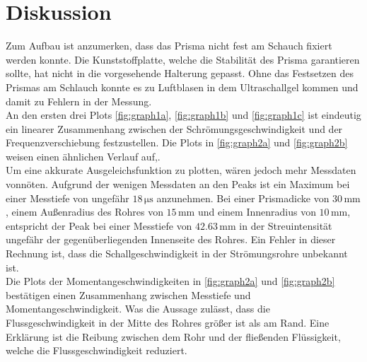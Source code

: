 \section{Diskussion}
\label{sec:diskussion}

Zum Aufbau ist anzumerken, dass das Prisma nicht fest am Schauch fixiert werden konnte. Die Kunststoffplatte, welche die Stabilität des Prisma garantieren sollte, hat nicht in die vorgesehende Halterung gepasst.
Ohne das Festsetzen des Prismas am Schlauch konnte es zu Luftblasen in dem Ultraschallgel kommen und damit zu Fehlern in der Messung. \\

An den ersten drei Plots \autoref{fig:graph1a}, \autoref{fig:graph1b} und \autoref{fig:graph1c} ist eindeutig ein linearer Zusammenhang zwischen der Schrömungsgeschwindigkeit und der Frequenzverschiebung festzustellen.
Die Plots in \autoref{fig:graph2a} und \autoref{fig:graph2b} weisen einen ähnlichen Verlauf auf,. \\
Um eine akkurate Ausgeleichsfunktion zu plotten, wären jedoch mehr Messdaten vonnöten. 
Aufgrund der wenigen Messdaten an den Peaks ist ein Maximum bei einer Messtiefe von ungefähr $18  \, \unit{\micro\second}$ anzunehmen. 
Bei einer Prismadicke von $30 \, \unit{\milli\meter} $, einem Außenradius des Rohres von $15 \, \unit{\milli\meter} $ und einem Innenradius von $10 \, \unit{\milli\meter}  $, entspricht der Peak bei einer Messtiefe von  $42.63 \, \unit{\milli\meter} $ in der Streuintensität ungefähr der gegenüberliegenden Innenseite des Rohres.
Ein Fehler in dieser Rechnung ist, dass die Schallgeschwindigkeit in der Strömungsrohre unbekannt ist.\\

Die Plots der Momentangeschwindigkeiten in \autoref{fig:graph2a} und \autoref{fig:graph2b} bestätigen einen Zusammenhang zwischen Messtiefe und Momentangeschwindigkeit.
Was die Aussage zulässt, dass die Flussgeschwindigkeit in der Mitte des Rohres größer ist als am Rand.
Eine Erklärung ist die Reibung zwischen dem Rohr und der fließenden Flüssigkeit, welche die Flussgeschwindigkeit reduziert.



